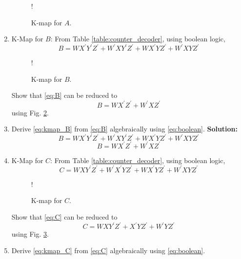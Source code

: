 \documentclass[journal,12pt,twocolumn]{IEEEtran}
\begin{document}
\begin{enumerate}
%
%
%
\begin{figure}[!h]
	\resizebox {\columnwidth} {!} {
		
	}
	\caption{K-map for $A$.}
	\label{fig:kmap_A}
\end{figure}
%
\item K-Map for $B$:
From Table \ref{table:counter_decoder}, using boolean logic,
\begin{equation}
	\label{eq:B}
	B = WX^{\prime}Y^{\prime}Z^{\prime} + W^{\prime}XY^{\prime}Z^{\prime}
	+WX^{\prime}YZ^{\prime}
	+W^{\prime}XYZ^{\prime}
\end{equation}
%
\begin{figure}[!h]
	\resizebox {\columnwidth} {!} {
		
	}
	\caption{K-map for $B$.}
	\label{fig:kmap_B}
\end{figure}
%
Show that \eqref{eq:B} can be reduced to
\begin{equation}
	\label{eq:kmap_B}
	B = WX^{\prime}Z^{\prime} + W^{\prime}XZ^{\prime}
\end{equation}
using Fig. \ref{fig:kmap_B}.
\item Derive \eqref{eq:kmap_B} from \eqref{eq:B} algebraically using \eqref{eq:boolean}.
\textbf{Solution:}
\begin{equation}
	\label{eq:B}
	B = WX^{\prime}Y^{\prime}Z^{\prime} + W^{\prime}XY^{\prime}Z^{\prime}
	+WX^{\prime}YZ^{\prime}
	+W^{\prime}XYZ^{\prime}
\end{equation}
\begin{equation}
	B = WX^{\prime}Z^{\prime} + W^{\prime}XZ^{\prime}
\end{equation}
%
\item {K-Map for $C$: }
From Table \ref{table:counter_decoder}, using boolean logic,
\begin{equation}
	\label{eq:C}
	C = WXY^{\prime}Z^{\prime} + W^{\prime}X^{\prime}YZ^{\prime}
	+WX^{\prime}YZ^{\prime}
	+W^{\prime}XYZ^{\prime}
\end{equation}
%
%
\begin{figure}[!h]
	\resizebox {\columnwidth} {!} {
		
	}
	\caption{K-map for $C$.}
	\label{fig:kmap_C}
\end{figure}
%
Show that \eqref{eq:C} can be reduced to
\begin{equation}
	\label{eq:kmap_C}
	C = WXY^{\prime}Z^{\prime}  +  X^{\prime}YZ^{\prime} + W^{\prime}YZ^{\prime}
\end{equation}
using Fig. \ref{fig:kmap_C}.
%
\item 
Derive \eqref{eq:kmap_C} from \eqref{eq:C} algebraically using \eqref{eq:boolean}.

\end{enumerate}
\end{document}
